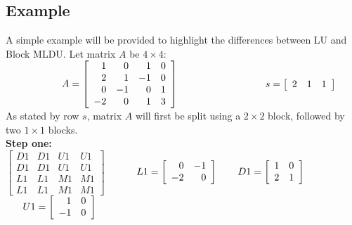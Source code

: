 \subsection{Example}

A simple example will be provided to highlight the differences between LU and Block MLDU. Let matrix $A$ be $4 \times 4$:\\

$
\hspace{20mm} A = 
\left\lbrack\begin{array}{rrrr}
           1&           0&           1&           0\\
           2&           1&          -1&           0\\
           0&          -1&           0&           1\\
          -2&           0&           1&           3
\end{array}\right\rbrack
$
$
\hspace{30mm} s =
\left\lbrack\begin{array}{rrr}
           2&           1&           1
\end{array}\right\rbrack
$\\

\noindent As stated by row $s$, matrix $A$ will first be split using a $2 \times 2$ block, followed by two $1 \times 1$ blocks.\\

\noindent \textbf{Step one:}\\

$
\left\lbrack\begin{array}{rr|rr}
          D1&          D1&          U1&          U1\\
          D1&          D1&          U1&          U1\\ \hline
          L1&          L1&          M1&          M1\\
          L1&          L1&          M1&          M1
\end{array}\right\rbrack
$
$
\hspace{10mm} L1 = 
\left\lbrack\begin{array}{rr}
           0&          -1\\
          -2&           0
\end{array}\right\rbrack
$
$
\hspace{6mm} D1 = 
\left\lbrack\begin{array}{rr}
           1&           0\\
           2&           1
\end{array}\right\rbrack
$
$
\hspace{6mm} U1 = 
\left\lbrack\begin{array}{rr}
           1&           0\\
          -1&           0
\end{array}\right\rbrack
$\\

